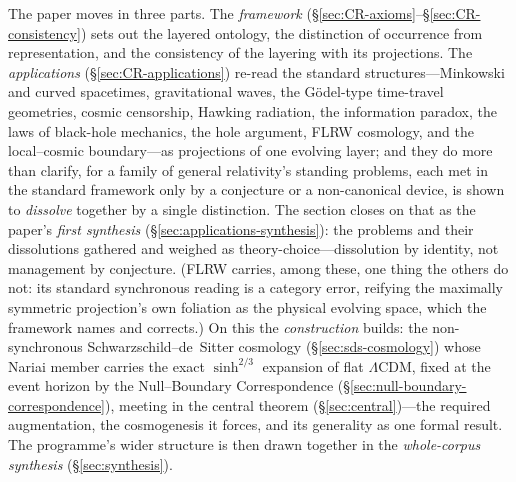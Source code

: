 \documentclass[11pt,a4paper]{article}
\theoremstyle{plain}
\theoremstyle{definition}
\theoremstyle{remark}
\begin{document}
The paper moves in three parts. The \emph{framework} (\S\ref{sec:CR-axioms}--\S\ref{sec:CR-consistency}) sets out the layered ontology, the distinction of occurrence from representation, and the consistency of the layering with its projections. The \emph{applications} (\S\ref{sec:CR-applications}) re-read the standard structures---Minkowski and curved spacetimes, gravitational waves, the G\"odel-type time-travel geometries, cosmic censorship, Hawking radiation, the information paradox, the laws of black-hole mechanics, the hole argument, FLRW cosmology, and the local--cosmic boundary---as projections of one evolving layer; and they do more than clarify, for a family of general relativity's standing problems, each met in the standard framework only by a conjecture or a non-canonical device, is shown to \emph{dissolve} together by a single distinction. The section closes on that as the paper's \emph{first synthesis} (\S\ref{sec:applications-synthesis}): the problems and their dissolutions gathered and weighed as theory-choice---dissolution by identity, not management by conjecture. (FLRW carries, among these, one thing the others do not: its standard synchronous reading is a category error, reifying the maximally symmetric projection's own foliation as the physical evolving space, which the framework names and corrects.) On this the \emph{construction} builds: the non-synchronous Schwarzschild--de~Sitter cosmology (\S\ref{sec:sds-cosmology}) whose Nariai member carries the exact $\sinh^{2/3}$ expansion of flat $\Lambda$CDM, fixed at the event horizon by the Null--Boundary Correspondence (\S\ref{sec:null-boundary-correspondence}), meeting in the central theorem (\S\ref{sec:central})---the required augmentation, the cosmogenesis it forces, and its generality as one formal result. The programme's wider structure is then drawn together in the \emph{whole-corpus synthesis} (\S\ref{sec:synthesis}).
\end{document}
